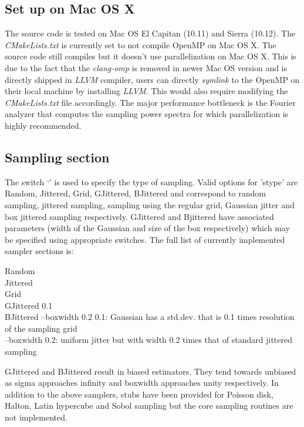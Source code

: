 \subsection{Set up on Mac OS X}
The source code is tested on Mac OS El Capitan (10.11) and Sierra (10.12). The \emph{CMakeLists.txt} 
is currently set to not compile OpenMP on Mac OS X. The source code still compiles but it doesn't use parallelization on Mac OS X. This is due to the fact that the \emph{clang-omp} is removed in newer Mac OS version and is directly shipped in \emph{LLVM} compiler, users can directly \emph{symlink} to the OpenMP on their local machine by installing \emph{LLVM}. This would also require modifying the \emph{CMakeLists.txt}  file accordingly. The major performance bottleneck is the Fourier analyzer that computes the sampling power
spectra for which parallelization is highly recommended. 
 
\subsection{Sampling section}
\label{subsec:ptanalyzer}
The switch `' is used to specify the type of sampling. Valid options for 'stype' are Random, Jittered, Grid, GJittered, BJittered and correspond to random sampling, jittered sampling, sampling using the regular grid, Gaussian jitter and box jittered sampling respectively. GJittered and Bjittered have associated parameters (width of the Gaussian and size of the box respectively) which may be specified using appropriate switches. The full list of currently implemented sampler sections is:
\begin{tcolorbox}
    Random \\
    Jittered \\
    Grid \\
    GJittered  0.1 \\
    BJittered --boxwidth 0.2 
\tcblower
    0.1: Gaussian has a std.dev. that is 0.1 times resolution of the sampling grid \\
   --boxwidth 0.2: uniform jitter but with width 0.2 times that of standard jittered sampling 
\end{tcolorbox}
GJittered and BJittered result in biased estimators. They tend towards unbiased as sigma approaches infinity and boxwidth approaches unity respectively. In addition to the above samplers, stubs have been provided for Poisson disk, Halton, Latin hypercube and Sobol sampling but the core sampling routines are not implemented. 


